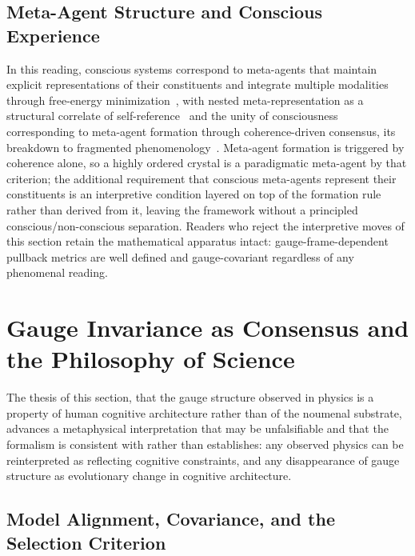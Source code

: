 \documentclass[11pt]{article}
\begin{document}
\subsection{Meta-Agent Structure and Conscious Experience}

In this reading, conscious systems correspond to meta-agents that maintain explicit representations of their constituents and integrate multiple modalities through free-energy minimization~\cite{Tononi2004, Dehaene2014}, with nested meta-representation as a structural correlate of self-reference~\cite{Cleeremans2007} and the unity of consciousness corresponding to meta-agent formation through coherence-driven consensus, its breakdown to fragmented phenomenology~\cite{Bayne2010}. Meta-agent formation is triggered by coherence alone, so a highly ordered crystal is a paradigmatic meta-agent by that criterion; the additional requirement that conscious meta-agents represent their constituents is an interpretive condition layered on top of the formation rule rather than derived from it, leaving the framework without a principled conscious/non-conscious separation. Readers who reject the interpretive moves of this section retain the mathematical apparatus intact: gauge-frame-dependent pullback metrics are well defined and gauge-covariant regardless of any phenomenal reading.

\section{Gauge Invariance as Consensus and the Philosophy of Science}\label{sec:gauge_invariance_consensus}

The thesis of this section, that the gauge structure observed in physics is a property of human cognitive architecture rather than of the noumenal substrate, advances a metaphysical interpretation that may be unfalsifiable and that the formalism is consistent with rather than establishes: any observed physics can be reinterpreted as reflecting cognitive constraints, and any disappearance of gauge structure as evolutionary change in cognitive architecture.

\subsection{Model Alignment, Covariance, and the Selection Criterion}
\end{document}
